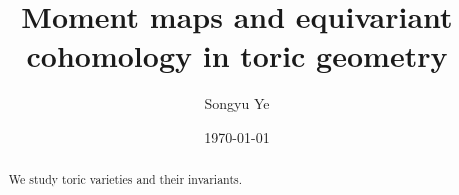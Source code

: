 \documentclass{amsart}
\numberwithin{equation}{section}
\theoremstyle{plain} %
\theoremstyle{definition}
\theoremstyle{remark}
\begin{document}
\title{Moment maps and equivariant cohomology in toric geometry}


\author{Songyu Ye} 

\address{}






\date{\today}

\begin{abstract}
We study toric varieties and their invariants. 
\end{abstract}


\maketitle
\tableofcontents




\end{document}
